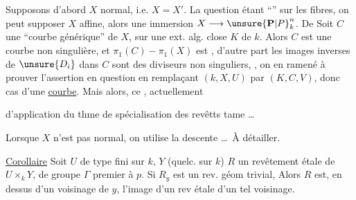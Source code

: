 Supposons d'abord $X$ normal, i.e. $X=X'$.
 La question étant
``'' sur les fibres,
on peut supposer $X$ affine, alors  une immersion
$X\longrightarrow\unsure{\mathbf P|P}_k^n$.
De 
Soit $C$ une ``courbe générique'' de $X$,
sur une ext. alg. close $K$ de $k$.
Alors $C$ est une courbe non singulière, et
$\pi_1(C)-\pi_1(X)$ est , d'autre part les images inverses
de $\unsure{D_i}$ dans $C$ sont des diviseurs non singuliers,
, on en 
ramené à prouver l'assertion en question en remplaçant $(k,X,U)$ par
$(K,C,V)$, donc cas d'une \uline{courbe}.
Mais alors, ce , actuellement


d'application du thme de spécialisation 
des revêtts tame \ldots

Lorsque $X$ n'est pas normal, on utilise la descente \ldots\ À détailler.

\uline{Corollaire} 
Soit $U$ de type fini sur $k$, $Y$
(quelc. sur $k$) 
$R$ un revêtement étale  de $U\times_k Y$,
de groupe $\Gamma$ premier à $p$.
Si $R_y$ est un rev. géom trivial,
Alors $R$ est, en dessus d'un voisinage de
$y$, l'image  d'un rev étale d'un tel voisinage.

